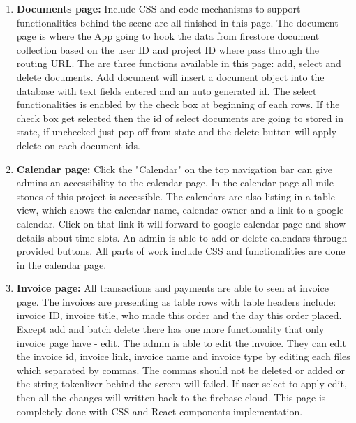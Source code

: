 \documentclass[onecolumn, draftclsnofoot,10pt, compsoc]{IEEEtran}
\begin{document}
\begin{enumerate}
\item  \textbf{Documents page:}\newline
 Include CSS and code mechanisms to support functionalities behind the scene are all finished in this page. The document page is where the App going to hook the data from firestore document collection based on the user ID and project ID where pass through the routing URL. The are three functions available in this page: add, select and delete documents. Add document will insert a document object into the database with text fields entered and an auto generated id. The select functionalities is enabled by the check box at beginning of each rows. If the check box get selected then the id of select documents are going to stored in state, if unchecked just pop off from state and the delete button will apply delete on each document ids.\newline
 
  \item  \textbf{Calendar page:}\newline
  Click the "Calendar" on the top navigation bar can give admins an accessibility to the calendar page. In the calendar page all mile stones of this project is accessible. The calendars are also listing in a table view, which shows the calendar name, calendar owner and a link to a google calendar. Click on that link it will forward to google calendar page and show details about time slots. An admin is able to add or delete calendars through provided buttons. All parts of work include CSS and functionalities are done in the calendar page.\newline
  
  \item  \textbf{Invoice page:}\newline
  All transactions and payments are able to seen at invoice page. The invoices are presenting as table rows with table headers include: invoice ID, invoice title, who made this order and the day this order placed. Except add and batch delete there has one more functionality that only invoice page have - edit. The admin is able to edit the invoice. They can edit the invoice id, invoice link, invoice name and invoice type by editing each files which separated by commas. The commas should not be deleted or added or the string tokenlizer behind the screen will failed. If user select to apply edit, then all the changes will written back to the firebase cloud. This page is completely done with CSS and React components implementation. \newline
  

\end{enumerate}
\end{document}
